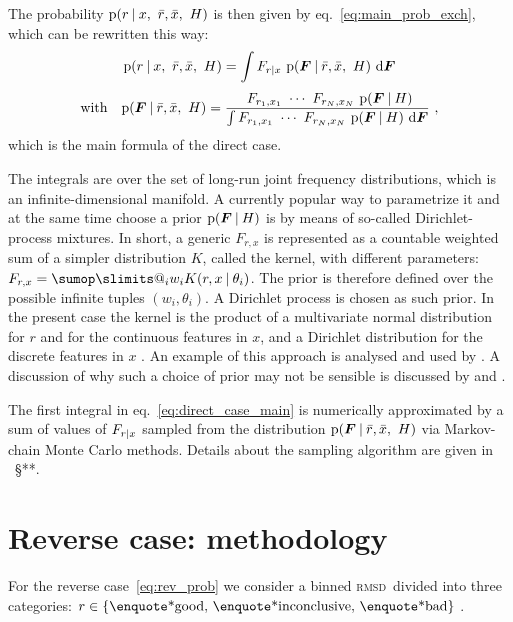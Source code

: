 \documentclass[\ifafour a4paper,12pt,\else a5paper,10pt,\fi%
onecolumn,oneside,article,%
british%
]{memoir}
\makeatletter
\theoremstyle{remark}
\theoremstyle{innote}
\def\sum{\DOTSI\sumop\slimits@}
\newcommand*{\di}{\mathrm{d}}%
\DeclarePairedDelimiter\set{\{}{\}}
\newcommand*{\p}{\mathrm{p}}%
\renewcommand*{\|}[1][]{\nonscript\:#1\vert\nonscript\:\mathopen{}}
\renewcommand*{\=}{\TextOrMath\texteq\eq}
\newcommand*{\sect}{\S}%
\newcommand*{\eqn}{eq.}%
\newcommand*{\wrench}{{\fontencoding{U}\fontfamily{fontawesomethree}\selectfont\symbol{114}}}
\newcommand{\mynote}[1]{ {\color{notecolour}#1}}
\newcommand*{\rmsd}{\textsc{rmsd}}
\newcommand*{\ro}{r}
\newcommand*{\xo}{x}
\newcommand*{\rd}{\bar{r}}
\newcommand*{\xd}{\bar{x}}
\newcommand*{\yF}{\bm{F}}
\makeatother
\begin{document}
The probability $\p(\ro \| \xo,\ \rd,\xd,\ H)$ is then given by
\eqn~\eqref{eq:main_prob_exch}, which can be rewritten this way:
\begin{equation}
  \label{eq:direct_case_main}
  \begin{gathered}
  \p(\ro \| \xo,\ \rd,\xd,\ H) =
  \int F_{\ro\|\xo} \ \p(\yF \| \rd, \xd,\ H)\ \di\yF
  \\[\jot]
  \text{with}\quad
  \p(\yF \| \rd, \xd,\ H) =
  \frac{
    \ F_{r_{1},x_{1}} \  \dotsm \ 
  F_{r_{N},x_{N}} \ \p(\yF \| H)
  }{
    \int F_{r_{1},x_{1}} \  \dotsm \ 
  F_{r_{N},x_{N}} \ \p(\yF \| H)\ \di\yF
  }  \ ,
\end{gathered}
\end{equation}
which is the main formula of the direct case.

The integrals are over the set of long-run joint frequency distributions,
which is an infinite-dimensional manifold. A currently popular way to
parametrize it and at the same time choose a prior $\p(\yF \| H)$ is by
means of so-called Dirichlet-process mixtures. In short, a generic
$F_{r,x}$ is represented as a countable weighted sum of a simpler
distribution $K$, called the kernel, with different parameters:
$F_{r,x} = \sum_{i}w_{i} K(r,x \| \theta_{i})$. The prior is therefore
defined over the possible infinite tuples $(w_{i},\theta_{i})$. A Dirichlet
process is chosen as such prior. In the present case the kernel is the
product of a multivariate normal distribution for $r$ and for the
continuous features in $x$, and a Dirichlet distribution for the discrete
features in $x$ \parencites[\sect~3.3]{liveranietal2015}. An example of
this approach is analysed and used by \textcites{muelleretal1996}. A
discussion of why such a choice of prior may not be sensible is discussed
by \textcite{petrone2017} and \textcite[\sect~4]{quintanaetal2020}.



The first integral in \eqn~\eqref{eq:direct_case_main} is numerically
approximated by a sum of values of $F_{\ro \| \xo}$ sampled from the
distribution $\p(\yF \| \rd, \xd,\ H)$ via Markov-chain Monte Carlo
methods. Details about the sampling algorithm are given in \mynote{\wrench\
  \sect***}.

\section{Reverse case: methodology}
\label{sec:reverse_method}

For the reverse case~\eqref{eq:rev_prob} we consider a binned \rmsd\
divided into three categories:
$r \in \set{\text{\enquote*{good}},\, \text{\enquote*{inconclusive}},\,
  \text{\enquote*{bad}}}$ .
\end{document}
